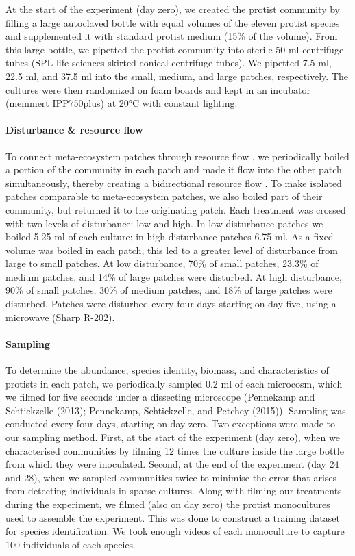 \documentclass[
]{article}
\begin{document}
At the start of the experiment (day zero), we created the protist
community by filling a large autoclaved bottle with equal volumes of the
eleven protist species and supplemented it with standard protist medium
(15\% of the volume). From this large bottle, we pipetted the protist
community into sterile 50 ml centrifuge tubes (SPL life sciences skirted
conical centrifuge tubes). We pipetted 7.5 ml, 22.5 ml, and 37.5 ml into
the small, medium, and large patches, respectively. The cultures were
then randomized on foam boards and kept in an incubator (memmert
IPP750plus) at 20°C with constant lighting.

\hypertarget{disturbance-resource-flow}{%
\paragraph{Disturbance \& resource
flow}\label{disturbance-resource-flow}}

To connect meta-ecosystem patches through resource flow , we
periodically boiled a portion of the community in each patch and made it
flow into the other patch simultaneously, thereby creating a
bidirectional resource flow . To make isolated patches comparable to
meta-ecosystem patches, we also boiled part of their community, but
returned it to the originating patch. Each treatment was crossed with
two levels of disturbance: low and high. In low disturbance patches we
boiled 5.25 ml of each culture; in high disturbance patches 6.75 ml. As
a fixed volume was boiled in each patch, this led to a greater level of
disturbance from large to small patches. At low disturbance, 70\% of
small patches, 23.3\% of medium patches, and 14\% of large patches were
disturbed. At high disturbance, 90\% of small patches, 30\% of medium
patches, and 18\% of large patches were disturbed. Patches were
disturbed every four days starting on day five, using a microwave (Sharp
R-202).

\hypertarget{sampling}{%
\paragraph{Sampling}\label{sampling}}

To determine the abundance, species identity, biomass, and
characteristics of protists in each patch, we periodically sampled 0.2
ml of each microcosm, which we filmed for five seconds under a
dissecting microscope (Pennekamp and Schtickzelle (2013); Pennekamp,
Schtickzelle, and Petchey (2015)). Sampling was conducted every four
days, starting on day zero. Two exceptions were made to our sampling
method. First, at the start of the experiment (day zero), when we
characterised communities by filming 12 times the culture inside the
large bottle from which they were inoculated. Second, at the end of the
experiment (day 24 and 28), when we sampled communities twice to
minimise the error that arises from detecting individuals in sparse
cultures. Along with filming our treatments during the experiment, we
filmed (also on day zero) the protist monocultures used to assemble the
experiment. This was done to construct a training dataset for species
identification. We took enough videos of each monoculture to capture 100
individuals of each species.
\end{document}
